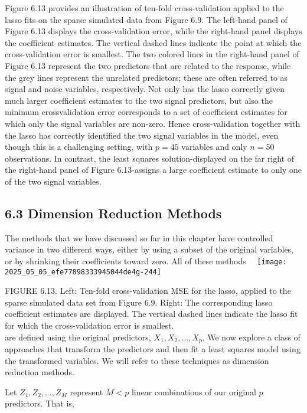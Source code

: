 \documentclass[10pt]{article}
\begin{document}
Figure 6.13 provides an illustration of ten-fold cross-validation applied to the lasso fits on the sparse simulated data from Figure 6.9. The left-hand panel of Figure 6.13 displays the cross-validation error, while the right-hand panel displays the coefficient estimates. The vertical dashed lines indicate the point at which the cross-validation error is smallest. The two colored lines in the right-hand panel of Figure 6.13 represent the two predictors that are related to the response, while the grey lines represent the unrelated predictors; these are often referred to as signal and noise variables, respectively. Not only has the lasso correctly given much larger coefficient estimates to the two signal predictors, but also the minimum crossvalidation error corresponds to a set of coefficient estimates for which only the signal variables are non-zero. Hence cross-validation together with the lasso has correctly identified the two signal variables in the model, even though this is a challenging setting, with $p=45$ variables and only $n=50$ observations. In contrast, the least squares solution-displayed on the far right of the right-hand panel of Figure 6.13-assigns a large coefficient estimate to only one of the two signal variables.

\subsection*{6.3 Dimension Reduction Methods}
The methods that we have discussed so far in this chapter have controlled variance in two different ways, either by using a subset of the original variables, or by shrinking their coefficients toward zero. All of these methods\
\
\texttt{[image: 2025\_05\_05\_efe77898333945044de4g-244]}

FIGURE 6.13. Left: Ten-fold cross-validation MSE for the lasso, applied to the sparse simulated data set from Figure 6.9. Right: The corresponding lasso coefficient estimates are displayed. The vertical dashed lines indicate the lasso fit for which the cross-validation error is smallest.\\
are defined using the original predictors, $X_{1}, X_{2}, \ldots, X_{p}$. We now explore a class of approaches that transform the predictors and then fit a least squares model using the transformed variables. We will refer to these techniques as dimension reduction methods.

Let $Z_{1}, Z_{2}, \ldots, Z_{M}$ represent $M<p$ linear combinations of our original $p$ predictors. That is,
\end{document}
